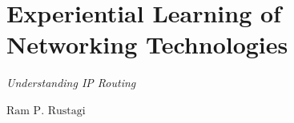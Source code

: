 \chapter{Experiential Learning of Networking Technologies}

\vskip -15pt

\centerline{{\LARGE\sl Understanding IP Routing}}


\vskip 0.8cm

\begin{center}
{\large\uppercase{$\text{Ram P. Rustagi}$}} 


\vskip -6pt

\end{center}

\vskip 2cm




\vfill




\newpage

